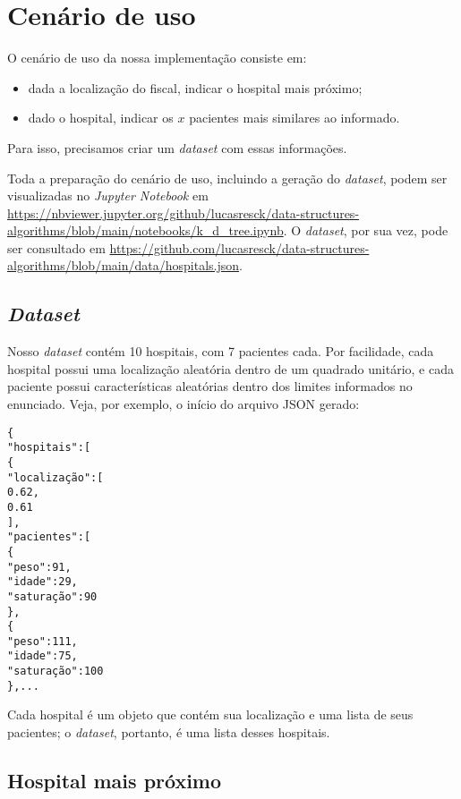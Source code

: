 \section{Cenário de uso}
    \label{sec:usage_scenario}

    O cenário de uso da nossa implementação consiste em:
    \begin{itemize}
        \item dada a localização do fiscal, indicar o hospital mais próximo;
        \item dado o hospital, indicar os $x$ pacientes mais similares ao informado.
    \end{itemize}
    Para isso, precisamos criar um \textit{dataset} com essas informações.

    Toda a preparação do cenário de uso, incluindo a geração do \textit{dataset}, podem ser visualizadas no \textit{Jupyter Notebook} em \url{https://nbviewer.jupyter.org/github/lucasresck/data-structures-algorithms/blob/main/notebooks/k_d_tree.ipynb}. O \textit{dataset}, por sua vez, pode ser consultado em \url{https://github.com/lucasresck/data-structures-algorithms/blob/main/data/hospitals.json}.

    \subsection{\textit{Dataset}}

        Nosso \textit{dataset} contém 10 hospitais, com 7 pacientes cada. Por facilidade, cada hospital possui uma localização aleatória dentro de um quadrado unitário, e cada paciente possui características aleatórias dentro dos limites informados no enunciado.
        Veja, por exemplo, o início do arquivo JSON gerado:
        \begin{alltt}
\{
    "hospitais": [
        \{
            "localização": [
                0.62,
                0.61
            ],
            "pacientes": [
                \{
                    "peso": 91,
                    "idade": 29,
                    "saturação": 90
                \},
                \{
                    "peso": 111,
                    "idade": 75,
                    "saturação": 100
                \}, ...
        \end{alltt}
        Cada hospital é um objeto que contém sua localização e uma lista de seus pacientes; o \textit{dataset}, portanto, é uma lista desses hospitais.

    \subsection{Hospital mais próximo}
        \label{sec:nearest_hospital}


